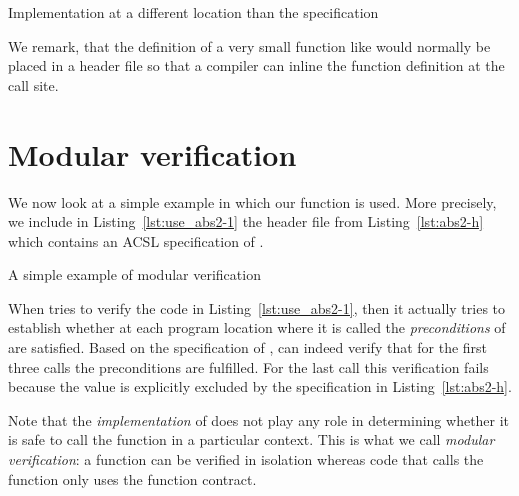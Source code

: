 \begin{listing}[hbt]
\begin{minipage}{\textwidth}

\end{minipage}
\caption{\label{lst:abs2-c} Implementation at a different location than the specification}
\end{listing}

We remark, that the definition of a very small function like  would normally
be placed in a header file so that a compiler can inline the function definition
at the call site.


\section{Modular verification}
\label{sec:modular-verification}

We now look at a simple example in which our function  is used.
More precisely, we include in Listing~\ref{lst:use_abs2-1} the
header file from Listing~\ref{lst:abs2-h} which contains an ACSL specification of .

\begin{listing}[hbt]
\begin{minipage}{\textwidth}

\end{minipage}
\caption{\label{lst:use_abs2-1} A simple example of modular verification}
\end{listing}

\FloatBarrier

When \framacwp tries to verify the code in Listing~\ref{lst:use_abs2-1},
then it actually tries to establish whether at each program location where
it is called the \emph{preconditions} of  are satisfied.
Based on the specification of ,
\framacwp can indeed verify that for the first three calls the preconditions are fulfilled.
For the last call this verification fails because the value 
is explicitly excluded by the specification in Listing~\ref{lst:abs2-h}.

Note that the \emph{implementation} of 
does not play any role in determining whether it is safe to
call the function in a particular context.
This is what we call \emph{modular verification}: a function can be verified in
isolation whereas code that calls the function only uses the function contract.

